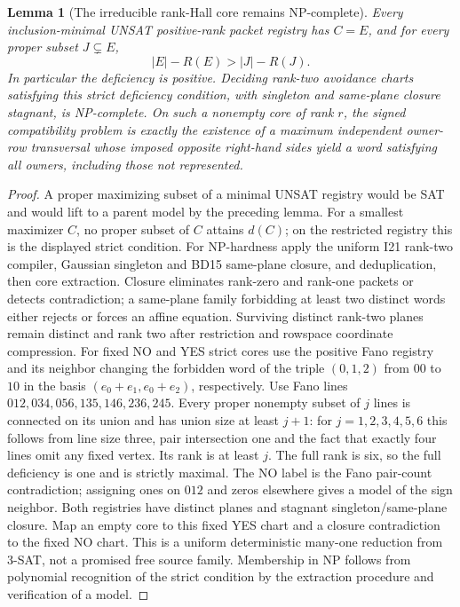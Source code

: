 \documentclass[11pt]{article}
\newtheorem{lemma}[theorem]{Lemma}
\begin{document}
\begin{lemma}[The irreducible rank-Hall core remains NP-complete]\label{lem:ds15-residual}
Every inclusion-minimal UNSAT positive-rank packet registry has $C=E$, and for every proper subset $J\subsetneq E$,
\[
 |E|-R(E)>|J|-R(J).
\]
In particular the deficiency is positive. Deciding rank-two avoidance charts satisfying this strict deficiency condition, with singleton and same-plane closure stagnant, is NP-complete. On such a nonempty core of rank $r$, the signed compatibility problem is exactly the existence of a maximum independent owner-row transversal whose imposed opposite right-hand sides yield a word satisfying \emph{all} owners, including those not represented.
\end{lemma}
\begin{proof}
A proper maximizing subset of a minimal UNSAT registry would be SAT and would lift to a parent model by the preceding lemma. For a smallest maximizer $C$, no proper subset of $C$ attains $d(C)$; on the restricted registry this is the displayed strict condition. For NP-hardness apply the uniform I21 rank-two compiler, Gaussian singleton and BD15 same-plane closure, and deduplication, then core extraction. Closure eliminates rank-zero and rank-one packets or detects contradiction; a same-plane family forbidding at least two distinct words either rejects or forces an affine equation. Surviving distinct rank-two planes remain distinct and rank two after restriction and rowspace coordinate compression. For fixed NO and YES strict cores use the positive Fano registry and its neighbor changing the forbidden word of the triple $(0,1,2)$ from $00$ to $10$ in the basis $(e_0+e_1,e_0+e_2)$, respectively. Use Fano lines $012,034,056,135,146,236,245$. Every proper nonempty subset of $j$ lines is connected on its union and has union size at least $j+1$: for $j=1,2,3,4,5,6$ this follows from line size three, pair intersection one and the fact that exactly four lines omit any fixed vertex. Its rank is at least $j$. The full rank is six, so the full deficiency is one and is strictly maximal. The NO label is the Fano pair-count contradiction; assigning ones on $012$ and zeros elsewhere gives a model of the sign neighbor. Both registries have distinct planes and stagnant singleton/same-plane closure. Map an empty core to this fixed YES chart and a closure contradiction to the fixed NO chart. This is a uniform deterministic many-one reduction from 3-SAT, not a promised free source family. Membership in NP follows from polynomial recognition of the strict condition by the extraction procedure and verification of a model.


\end{proof}
\end{document}

